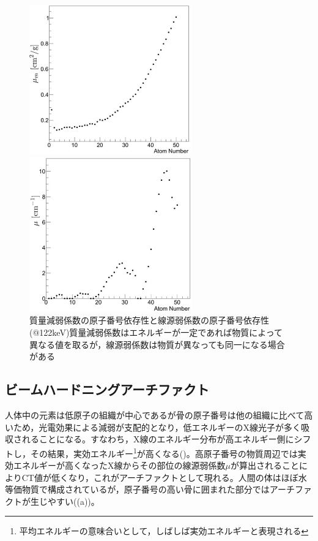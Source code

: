 \begin{figure}[H]
 \begin{minipage}{0.52\hsize}
  \begin{center}
   \includegraphics[width=7cm]{image/other/mass_atten.eps}
  \end{center}
 \end{minipage}
 \begin{minipage}{0.3\hsize}
  \begin{center}
   \includegraphics[width=7cm]{image/other/linear_atten.eps}
  \end{center}
 \end{minipage}
 \begin{center}
  \vspace{-1zh}
  \caption{質量減弱係数の原子番号依存性と線源弱係数の原子番号依存性(@122keV)\newline 質量減弱係数はエネルギーが一定であれば物質によって異なる値を取るが，線源弱係数は物質が異なっても同一になる場合がある}
  \label{fig:atten}
  \end{center}
\end{figure}


\subsection{ビームハードニングアーチファクト}
人体中の元素は低原子の組織が中心であるが骨の原子番号は他の組織に比べて高いため，光電効果による減弱が支配的となり，低エネルギーのX線光子が多く吸収されることになる。すなわち，X線のエネルギー分布が高エネルギー側にシフトし，その結果，実効エネルギー\footnote{平均エネルギーの意味合いとして，しばしば実効エネルギーと表現される}が高くなる()。高原子番号の物質周辺では実効エネルギーが高くなったX線からその部位の線源弱係数$\mu$が算出されることによりCT値が低くなり，これがアーチファクトとして現れる。人間の体はほぼ水等価物質で構成されているが，原子番号の高い骨に囲まれた部分ではアーチファクトが生じやすい((a))。

